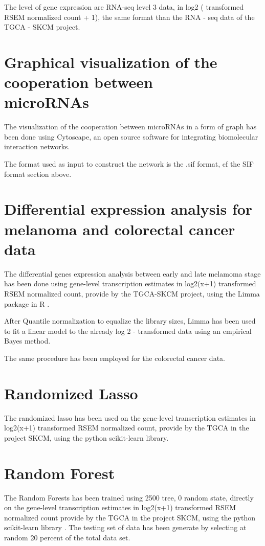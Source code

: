 \documentclass[a4paper,12pt]{report}
\begin{document}
The level of gene expression are RNA-seq level 3 data, in log2 ( transformed RSEM normalized count + 1), the same format than the RNA - seq data of the TGCA - SKCM project.

\section{Graphical visualization of the cooperation between \\ microRNAs}

The  visualization of the cooperation between microRNAs in a form of graph has been done using Cytoscape\cite{cytoscape}, an open source software for integrating biomolecular interaction networks.

The format used as input to construct the network is the .sif format, cf the SIF format section above.


\section{Differential expression analysis for melanoma and colorectal cancer data}

The differential genes expression analysis between early and late melamoma stage has been done using gene-level transcription estimates in log2(x+1) transformed RSEM normalized count, provide by the TGCA-SKCM project, using the Limma package in R \cite{limma}.

After Quantile normalization to equalize the library sizes\cite{limma}, Limma has been used to fit a linear model to the already log 2 - transformed data using an empirical Bayes method\cite{limma}.

The same procedure has been employed for the colorectal cancer data.


\section{Randomized Lasso}

The randomized lasso has been used  on the gene-level transcription estimates in log2(x+1) transformed RSEM normalized count, provide by the TGCA in the project SKCM, using the python scikit-learn library\cite{scikit}.

\section{Random Forest}

The Random Forests has been trained using 2500 tree, 0 random state, directly on the gene-level transcription estimates in log2(x+1) transformed RSEM normalized count provide by the TGCA in the project SKCM, using the python scikit-learn library \cite{scikit}.
The testing set of data has been generate by selecting at random 20 percent of the total data set.
\end{document}
